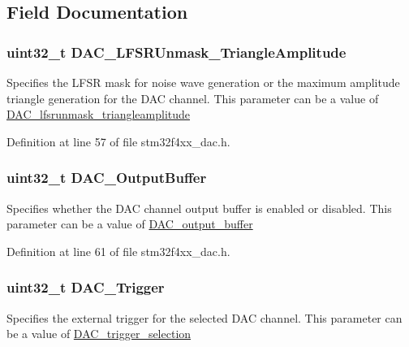 \subsection{Field Documentation}
\hypertarget{struct_d_a_c___init_type_def_aff0a3e0149873939ded70bc466c85dc2}{
\subsubsection[{D\-A\-C\-\_\-\-L\-F\-S\-R\-Unmask\-\_\-\-Triangle\-Amplitude}]{\setlength{\rightskip}{0pt plus 5cm}uint32\-\_\-t D\-A\-C\-\_\-\-L\-F\-S\-R\-Unmask\-\_\-\-Triangle\-Amplitude}}\label{struct_d_a_c___init_type_def_aff0a3e0149873939ded70bc466c85dc2}
Specifies the L\-F\-S\-R mask for noise wave generation or the maximum amplitude triangle generation for the D\-A\-C channel. This parameter can be a value of \hyperlink{group___d_a_c__lfsrunmask__triangleamplitude}{D\-A\-C\-\_\-lfsrunmask\-\_\-triangleamplitude} 

Definition at line 57 of file stm32f4xx\-\_\-dac.\-h.

\hypertarget{struct_d_a_c___init_type_def_a22d062287d8cbba2342585ea7944f61d}{
\subsubsection[{D\-A\-C\-\_\-\-Output\-Buffer}]{\setlength{\rightskip}{0pt plus 5cm}uint32\-\_\-t D\-A\-C\-\_\-\-Output\-Buffer}}\label{struct_d_a_c___init_type_def_a22d062287d8cbba2342585ea7944f61d}
Specifies whether the D\-A\-C channel output buffer is enabled or disabled. This parameter can be a value of \hyperlink{group___d_a_c__output__buffer}{D\-A\-C\-\_\-output\-\_\-buffer} 

Definition at line 61 of file stm32f4xx\-\_\-dac.\-h.

\hypertarget{struct_d_a_c___init_type_def_ae1edfee233aee962b357cbc3994b330b}{
\subsubsection[{D\-A\-C\-\_\-\-Trigger}]{\setlength{\rightskip}{0pt plus 5cm}uint32\-\_\-t D\-A\-C\-\_\-\-Trigger}}\label{struct_d_a_c___init_type_def_ae1edfee233aee962b357cbc3994b330b}
Specifies the external trigger for the selected D\-A\-C channel. This parameter can be a value of \hyperlink{group___d_a_c__trigger__selection}{D\-A\-C\-\_\-trigger\-\_\-selection} 

